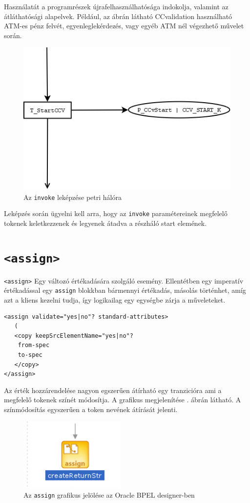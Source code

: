Használatát a programrészek újrafelhasználhatósága indokolja, valamint az átláthatósági alapelvek. Például, az ábrán látható CCvalidation használható ATM-es pénz felvét, egyenleglekérdezés, vagy egyéb ATM nél végezhető művelet során. 

\begin{figure}[h!]
\centering
\includegraphics[scale=0.6]{images/invokenet.png}
\caption{Az \texttt{invoke} leképzése petri hálóra}
\label{fig:invokenet}
\end{figure}
Leképzés során ügyelni kell arra, hogy az \texttt{invoke} paramétereinek megfelelő tokenek keletkezzenek és legyenek átadva a részháló start elemének.

\section{\texttt{<assign>}}

\texttt{<assign>} Egy változó értékadására szolgáló esemény. Ellentétben egy imperatív értékadással egy \texttt{assign} blokkban bármennyi értékadás, másolás történhet, amíg azt a kliens kezelni tudja, így logikailag egy egységbe zárja a műveleteket.  
\begin{verbatim}
<assign validate="yes|no"? standard-attributes>
   (
   <copy keepSrcElementName="yes|no"? 
  	from-spec
  	to-spec
   </copy>
</assign>
\end{verbatim}
Az érték hozzárendelése nagyon egszerűen átírható egy tranzicióra ami a megfelelő tokenek színét módosítja. 
A grafikus megjelenítése . ábrán látható.
A színmódosítás egyszerűen a token nevének átírását jelenti. 
\begin{figure}[h!]
\centering
\includegraphics[scale=1]{images/assign.png}
\caption{Az \texttt{assign} grafikus jelölése az Oracle BPEL designer-ben}
\label{fig:assign}
\end{figure}

